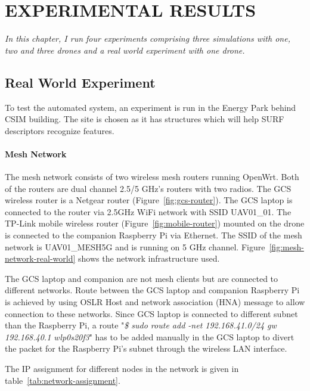 \setlength{\parindent}{0.5in} 
\setlength{\parskip}{0mm}
\setlength{\baselineskip}{1.6em}

\chapter{EXPERIMENTAL RESULTS}
\label{ch:results}
\textit{In this chapter, I run four experiments comprising three simulations with one, two and three drones and a real world experiment with one drone.  }

\section{Real World Experiment}
To test the automated system, an experiment is run in the Energy Park behind CSIM building. The site is chosen as it has structures which will help SURF descriptors recognize features. 
\subsubsection{Mesh Network}

The mesh network consists of two wireless mesh routers running OpenWrt. Both of the routers are dual channel 2.5/5 GHz's routers with two radios. The GCS wireless router is a Netgear router (Figure~\ref{fig:gcs-router}). The GCS laptop is connected to the router via 2.5GHz WiFi network with SSID UAV01\_01. The TP-Link mobile wireless router (Figure~\ref{fig:mobile-router}) mounted on the drone is connected to the companion Raspberry Pi via Ethernet. The SSID of the mesh network is UAV01\_MESH5G and is running on 5 GHz channel. Figure~\ref{fig:mesh-network-real-world} shows the network infrastructure used.

The GCS laptop and companion are not mesh clients but are connected to different networks. Route between the GCS laptop and companion Raspberry Pi is achieved by using OSLR Host and network association (HNA) message to allow connection to these networks. Since GCS laptop is connected to different subnet than the Raspberry Pi, a route "\textit{\$ sudo route add -net 192.168.41.0/24 gw 192.168.40.1 wlp0s20f3}" has to be added manually in the GCS laptop to divert the packet for the Raspberry Pi's subnet through the wireless LAN interface.

The IP assignment for different nodes in the network is given in table~\ref{tab:network-assignment}.



